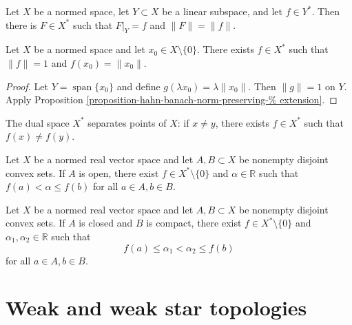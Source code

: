 \begin{proposition}
\label{%
proposition-hahn-banach-norm-preserving-%
extension}
Let $X$ be a normed space, let $Y\subset X$
be a linear subspace, and let $f\in Y^*$.
Then there is $F\in X^*$ such that $F|_Y=f$
and $\|F\|=\|f\|$.
\end{proposition}

\begin{proposition}
\label{proposition-norming-functional}
Let $X$ be a normed space and let $x_0 \in X
\setminus \{0\}$. There exists $f \in X^*$
such that $\|f\|=1$ and $f(x_0) = \|x_0\|$.
\end{proposition}

\begin{proof}
Let $Y = \operatorname{span}\{x_0\}$ and
define $g(\lambda x_0) = \lambda \|x_0\|$.
Then $\|g\|=1$ on $Y$. Apply Proposition
\ref{proposition-hahn-banach-norm-preserving-%
extension}.
\end{proof}

\begin{proposition}
\label{proposition-dual-separates-points}
The dual space $X^*$ separates points of $X$:
if $x \neq y$, there exists $f \in X^*$ such
that $f(x) \neq f(y)$.
\end{proposition}

\begin{theorem}
\label{theorem-hahn-banach-geometric-1}
Let $X$ be a normed real vector space and let
$A, B \subset X$ be nonempty disjoint convex
sets. If $A$ is open, there exist $f \in X^*
\setminus \{0\}$ and $\alpha \in \mathbb{R}$
such that $f(a) < \alpha \leq f(b)$ for all
$a \in A, b \in B$.
\end{theorem}

\begin{theorem}
\label{theorem-hahn-banach-geometric-2}
Let $X$ be a normed real vector space and let
$A, B \subset X$ be nonempty disjoint convex
sets. If $A$ is closed and $B$ is compact,
there exist $f \in X^* \setminus \{0\}$ and
$\alpha_1, \alpha_2 \in \mathbb{R}$ such that
$$
f(a) \leq \alpha_1 < \alpha_2 \leq f(b)
$$
for all $a \in A, b \in B$.
\end{theorem}


\section{Weak and weak star topologies}
\label{section-weak-topologies}

